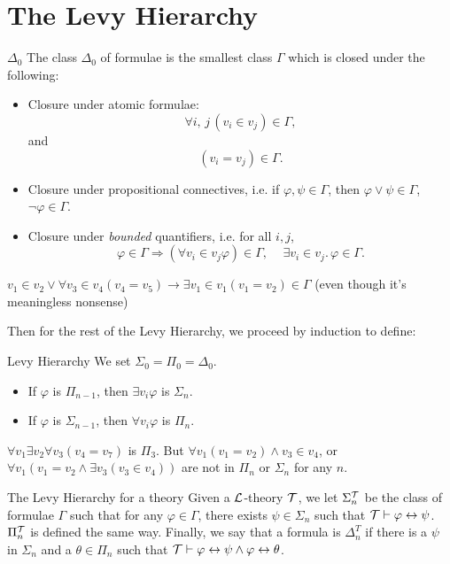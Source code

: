 \documentclass{article}
\begin{document}
\section{The Levy Hierarchy}
\begin{fancydefine}{$\Delta_{0}$}
    The class $\Delta_{0}$ of formulae is the smallest class $\Gamma$ which is closed under the following: \begin{itemize}
        \item Closure under atomic formulae: \[ \forall i,\,j \, (v_{i} \in v_{j}) \in \Gamma,\]
              and \[ (v_{i} = v_{j}) \in \Gamma.\]
        \item Closure under propositional connectives, i.e. if $\varphi, \psi \in \Gamma$, then $\varphi \vee \psi \in \Gamma$, $\neg \varphi \in \Gamma$.
        \item Closure under \textit{bounded} quantifiers, i.e. for all $i,j$, \[ \varphi \in \Gamma \Rightarrow (\forall v_{i} \in v_{j} \varphi) \in \Gamma,\,\,\,\,\,\,\, \exists v_{i} \in v_{j}. \, \varphi \in \Gamma.\]
    \end{itemize}
\end{fancydefine}
\begin{ex*}
    \item $v_{1} \in v_{2} \vee \forall v_{3} \in v_{4} (v_{4} = v_{5}) \rightarrow \exists v_{1} \in v_{1} (v_{1} = v_{2}) \in \Gamma$ (even though it's meaningless nonsense)
\end{ex*}
Then for the rest of the Levy Hierarchy, we proceed by induction to define:
\begin{fancydefine}{Levy Hierarchy} We set $\Sigma_{0} = \Pi_{0} = \Delta_{0}$.
    \begin{itemize}
        \item If $\varphi$ is $\Pi_{n-1}$, then $\exists v_{i} \varphi$ is $\Sigma_{n}$.
        \item If $\varphi$ is $\Sigma_{n-1}$, then $\forall v_{i} \varphi$ is $\Pi_{n}$.
    \end{itemize}
\end{fancydefine}
\begin{ex*}
    $\forall v_{1} \exists v_{2} \forall v_{3} (v_{4}=v_{7})$ is $\Pi_{3}$. But $\forall v_{1}(v_{1}=v_{2}) \wedge v_{3} \in v_{4}$, or $\forall v_{1}(v_{1} = v_{2} \wedge \exists v_{3}(v_{3} \in v_{4}))$ are not in $\Pi_{n}$ or $\Sigma_{n}$ for any $n$.
\end{ex*}
\begin{fancydefine}{The Levy Hierarchy for a theory}
    Given a $\mathcal{L}$-theory $\mathcal{T}$, we let $\Sigma_{n}^{\mathcal{T}}$ be the class of formulae $\Gamma$ such that for any $\varphi \in \Gamma$, there exists $\psi \in \Sigma_{n}$ such that $\mathcal{T} \vdash \varphi \leftrightarrow \psi$. $\Pi_{n}^{\mathcal{T}}$ is defined the same way. \gap
    Finally, we say that a formula is $\Delta_{n}^{T}$ if there is a $\psi$ in $\Sigma_{n}$ and a $\theta \in \Pi_{n}$ such that $\mathcal{T} \vdash \varphi \leftrightarrow \psi \wedge \varphi \leftrightarrow \theta$.
\end{fancydefine}
\end{document}
